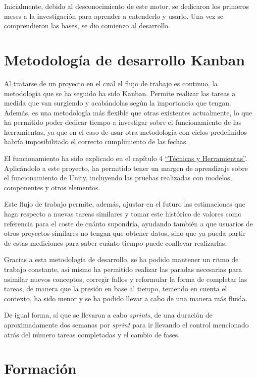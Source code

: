 Inicialmente, debido al desconocimiento de este motor, se dedicaron los primeros meses a la investigación para aprender a entenderlo y usarlo. Una vez se comprendieron las bases, se dio comienzo al desarrollo.

\section{Metodología de desarrollo Kanban}

Al tratarse de un proyecto en el cual el flujo de trabajo es continuo, la metodología que se ha seguido ha sido Kanban. Permite realizar las tareas a medida que van surgiendo y acabándolas según la importancia que tengan. Además, es una metodología más flexible que otras existentes actualmente, lo que ha permitido poder dedicar tiempo a investigar sobre el funcionamiento de las herramientas, ya que en el caso de usar otra metodología con ciclos predefinidos habría imposibilitado el correcto cumplimiento de las fechas.

El funcionamiento ha sido explicado en el capítulo 4 \hyperref[cap:tecnicas]{``Técnicas y Herramientas''}. Aplicándolo a este proyecto, ha permitido tener un margen de aprendizaje sobre el funcionamiento de Unity, incluyendo las pruebas realizadas con modelos, componentes y otros elementos.

Este flujo de trabajo permite, además, ajustar en el futuro las estimaciones que haga respecto a nuevas tareas similares y tomar este histórico de valores como referencia para el coste de cuánto supondría, ayudando también a que usuarios de otros proyectos similares no tengan que obtener datos, sino que ya pueda partir de estas mediciones para saber cuánto tiempo puede conllevar realizarlas.

Gracias a esta metodología de desarrollo, se ha podido mantener un ritmo de trabajo constante, así mismo ha permitido realizar las paradas necesarias para asimilar nuevos conceptos, corregir fallos y reformular la forma de completar las tareas, de manera que la presión en base al tiempo, teniendo en cuenta el contexto, ha sido menor y se ha podido llevar a cabo de una manera más fluida.

De igual forma, sí que se llevaron a cabo \textit{sprints}, de una duración de aproximadamente dos semanas por \textit{sprint} para ir llevando el control mencionado atrás del número tareas completadas y el cambio de fases.

\section{Formación}

